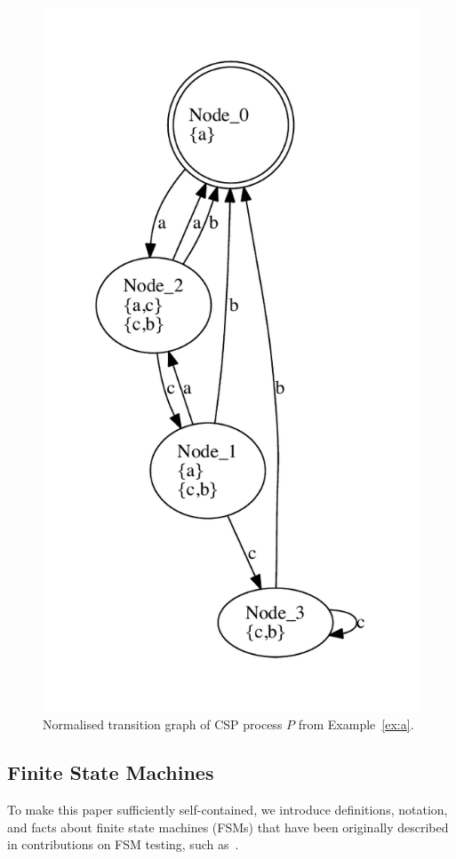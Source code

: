 \begin{figure}
 \begin{center}
\includegraphics[width=.5\textwidth]{q0.pdf}
\end{center}
\caption{Normalised transition graph of CSP process $P$ from Example~\ref{ex:a}.}
 \label{fig:tga}
 \end{figure}



\subsection{Finite State Machines}


To make this paper sufficiently self-contained, we introduce definitions, notation, and facts
about 
finite state machines (FSMs) that have been originally described in contributions on FSM testing, such as~\cite{petrenko_testing_2011,DBLP:conf/hase/PetrenkoY14,hierons_testing_2004}.

